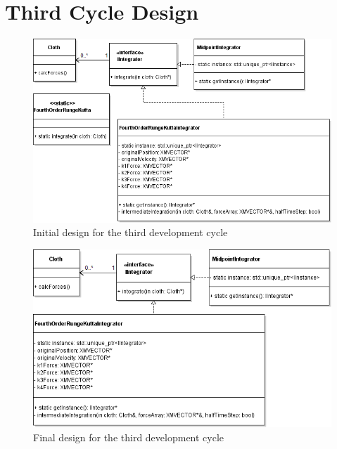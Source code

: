 \section{Third Cycle Design}
  \begin{figure}[!htb]
    \begin{center}
      \includegraphics[scale=0.70]{Figures/cycle_3_initial_design}
    \end{center}
    \caption{Initial design for the third development cycle}
    \label{fig:phase3 initial}
  \end{figure}
  
  \begin{figure}
    \begin{center}
      \includegraphics[scale=0.75]{Figures/cycle_3_final_design}
    \end{center}
    \caption{Final design for the third development cycle}
    \label{fig:phase3}
  \end{figure}

